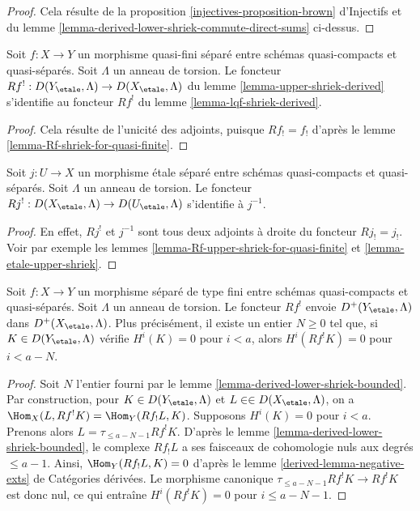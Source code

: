 \begin{proof}
Cela résulte de la
proposition \ref{injectives-proposition-brown} d'Injectifs
et du lemme \ref{lemma-derived-lower-shriek-commute-direct-sums} ci-dessus.
\end{proof}

\begin{lemma}
\label{lemma-Rf-upper-shriek-for-quasi-finite}
Soit $f : X \to Y$ un morphisme quasi-fini séparé entre schémas quasi-compacts
et quasi-séparés. Soit $\Lambda$ un anneau de torsion.
Le foncteur $Rf^! : D(Y_\etale, \Lambda) \to D(X_\etale, \Lambda)$
du lemme \ref{lemma-upper-shriek-derived} s'identifie au foncteur
$Rf^!$ du lemme \ref{lemma-lqf-shriek-derived}.
\end{lemma}

\begin{proof}
Cela résulte de l'unicité des adjoints, puisque $Rf_! = f_!$ d'après le
lemme \ref{lemma-Rf-shriek-for-quasi-finite}.
\end{proof}

\begin{lemma}
\label{lemma-Rf-upper-shriek-for-etale}
Soit $j : U \to X$ un morphisme étale séparé entre schémas quasi-compacts
et quasi-séparés. Soit $\Lambda$ un anneau de torsion.
Le foncteur $Rj^! : D(X_\etale, \Lambda) \to D(U_\etale, \Lambda)$
s'identifie à $j^{-1}$.
\end{lemma}

\begin{proof}
En effet, $Rj^!$ et $j^{-1}$ sont tous deux adjoints à droite du foncteur
$Rj_! = j_!$. Voir par exemple les lemmes
\ref{lemma-Rf-upper-shriek-for-quasi-finite} et
\ref{lemma-etale-upper-shriek}.
\end{proof}

\begin{lemma}
\label{lemma-twisted-inverse-image-bounded-below}
Soit $f : X \to Y$ un morphisme séparé de type fini entre
schémas quasi-compacts et quasi-séparés. Soit $\Lambda$ un anneau de
torsion. Le foncteur $Rf^!$ envoie $D^+(Y_\etale, \Lambda)$ dans
$D^+(X_\etale, \Lambda)$. Plus précisément, il existe un entier
$N \geq 0$ tel que, si $K \in D(Y_\etale, \Lambda)$ vérifie $H^i(K) = 0$
pour $i < a$, alors $H^i(Rf^!K) = 0$ pour $i < a - N$.
\end{lemma}

\begin{proof}
Soit $N$ l'entier fourni par le lemme \ref{lemma-derived-lower-shriek-bounded}.
Par construction, pour $K \in D(Y_\etale, \Lambda)$ et
$L \in \in D(X_\etale, \Lambda)$, on a
$\Hom_X(L, Rf^!K) = \Hom_Y(Rf_!L, K)$. Supposons $H^i(K) = 0$
pour $i < a$. Prenons alors $L = \tau_{\leq a - N - 1}Rf^!K$. D'après le
lemme \ref{lemma-derived-lower-shriek-bounded},
le complexe $Rf_!L$ a ses faisceaux de cohomologie nuls aux
degrés $\leq a - 1$. Ainsi, $\Hom_Y(Rf_!L, K) = 0$ d'après le
lemme \ref{derived-lemma-negative-exts} de Catégories dérivées.
Le morphisme canonique $\tau_{\leq a - N - 1}Rf^!K \to Rf^!K$
est donc nul, ce qui entraîne $H^i(Rf^!K) = 0$ pour $i \leq a - N - 1$.
\end{proof}

